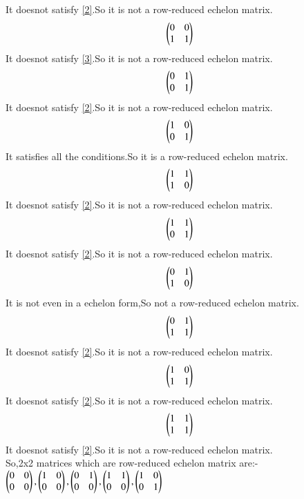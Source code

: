 \documentclass[journal,12pt,twocolumn]{IEEEtran}
\begin{document}
It doesnot satisfy \eqref{2}.So it is not a row-reduced echelon matrix.
\begin{align}
 \begin{pmatrix}0&0\\1&1\end{pmatrix}
\end{align}
It doesnot satisfy \eqref{3}.So it is not a row-reduced echelon matrix.
\begin{align}
 \begin{pmatrix}0&1\\0&1\end{pmatrix}
\end{align}
It doesnot satisfy \eqref{2}.So it is not a row-reduced echelon matrix.
\begin{align}
 \begin{pmatrix}1&0\\0&1\end{pmatrix}
\end{align}
It satisfies all the conditions.So it is a row-reduced echelon matrix.
\begin{align}
 \begin{pmatrix}1&1\\1&0\end{pmatrix}
\end{align}
It doesnot satisfy \eqref{2}.So it is not a row-reduced echelon matrix.
\begin{align}
 \begin{pmatrix}1&1\\0&1\end{pmatrix}
\end{align}
It doesnot satisfy \eqref{2}.So it is not a row-reduced echelon matrix.
\begin{align}
 \begin{pmatrix}0&1\\1&0\end{pmatrix}
\end{align}
It is not even in a echelon form,So not a row-reduced echelon matrix.
\begin{align}
 \begin{pmatrix}0&1\\1&1\end{pmatrix}
\end{align}
It doesnot satisfy \eqref{2}.So it is not a row-reduced echelon matrix.
\begin{align}
 \begin{pmatrix}1&0\\1&1\end{pmatrix}
\end{align}
It doesnot satisfy \eqref{2}.So it is not a row-reduced echelon matrix.
\begin{align}
 \begin{pmatrix}1&1\\1&1\end{pmatrix}
\end{align}
It doesnot satisfy \eqref{2}.So it is not a row-reduced echelon matrix.\\
So,2x2 matrices which are row-reduced echelon matrix are:-
$\begin{pmatrix}0&0\\0&0\end{pmatrix},\begin{pmatrix}1&0\\0&0\end{pmatrix},\begin{pmatrix}0&1\\0&0\end{pmatrix},\begin{pmatrix}1&1\\0&0\end{pmatrix},\begin{pmatrix}1&0\\0&1\end{pmatrix}$
\end{document}

